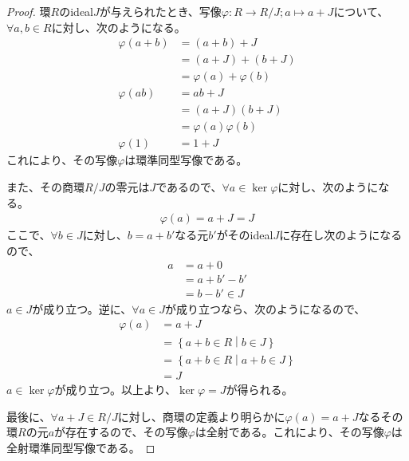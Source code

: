 \documentclass[dvipdfmx]{jsarticle}
\begin{document}
\begin{proof}
環$R$のideal$J$が与えられたとき、写像$\varphi:R \rightarrow {R}/{J};a \mapsto a + J$について、$\forall a,b \in R$に対し、次のようになる。
\begin{align*}
\varphi(a + b) &= (a + b) + J\\
&= (a + J) + (b + J)\\
&= \varphi(a) + \varphi(b)\\
\varphi(ab) &= ab + J\\
&= (a + J)(b + J)\\
&= \varphi(a)\varphi(b)\\
\varphi(1) &= 1 + J
\end{align*}
これにより、その写像$\varphi$は環準同型写像である。\par
また、その商環${R}/{J}$の零元は$J$であるので、$\forall a \in \ker\varphi$に対し、次のようになる。
\begin{align*}
\varphi(a) = a + J = J
\end{align*}
ここで、$\forall b \in J$に対し、$b = a + b'$なる元$b'$がそのideal$J$に存在し次のようになるので、
\begin{align*}
a &= a + 0\\
&= a + b' - b'\\
&= b - b' \in J
\end{align*}
$a \in J$が成り立つ。逆に、$\forall a \in J$が成り立つなら、次のようになるので、
\begin{align*}
\varphi(a) &= a + J\\
&= \left\{ a + b \in R \middle| b \in J \right\}\\
&= \left\{ a + b \in R \middle| a + b \in J \right\}\\
&= J
\end{align*}
$a \in \ker\varphi$が成り立つ。以上より、$\ker\varphi = J$が得られる。\par
最後に、$\forall a + J \in {R}/{J}$に対し、商環の定義より明らかに$\varphi(a) = a + J$なるその環$R$の元$a$が存在するので、その写像$\varphi$は全射である。これにより、その写像$\varphi$は全射環準同型写像である。
\end{proof}
\end{document}
